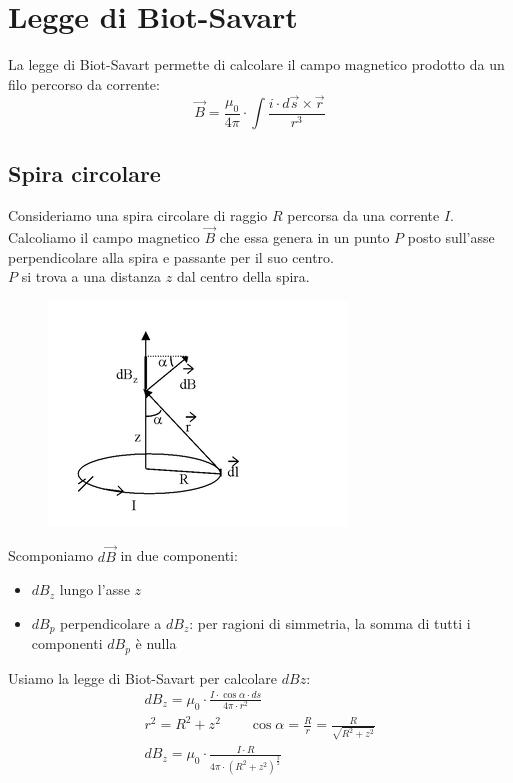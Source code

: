 \section{Legge di Biot-Savart}
La legge di Biot-Savart permette di calcolare il campo magnetico prodotto da un filo percorso da corrente:
\begin{displaymath}
	\vec{B} = \frac{\mu_0}{4\pi} \cdot \int \frac{i \cdot d\vec{s} \times \vec{r}}{r^3}
\end{displaymath}

\subsection{Spira circolare}
Consideriamo una spira circolare di raggio $R$ percorsa da una corrente $I$.\\
Calcoliamo il campo magnetico $\vec{B}$ che essa genera in un punto $P$ posto sull'asse perpendicolare alla spira e passante per il suo centro.\\
$P$ si trova a una distanza $z$ dal centro della spira.
\begin{figure}[h!]
	\centering
	\includegraphics[]{biotSavart.png}
\end{figure}
Scomponiamo $d\vec{B}$ in due componenti:
\begin{itemize}
\item{$dB_z$ lungo l'asse $z$}
\item{$dB_p$ perpendicolare a $dB_z$: per ragioni di simmetria, la somma di tutti i componenti $dB_p$ è nulla}
\end{itemize}
Usiamo la legge di Biot-Savart per calcolare $dBz$:
\begin{displaymath}\begin{aligned}
	dB_z = \mu_0 \cdot \frac{I \cdot \cos{\alpha} \cdot ds}{4\pi \cdot r^2}\\
    r^2 = R^2 + z^2 \qquad \cos{\alpha} = \frac{R}{r} = \frac{R}{\sqrt{R^2 + z^2}}\\
    dB_z = \mu_0 \cdot \frac{I \cdot R}{4\pi \cdot (R^2 + z^2)^\frac{3}{2}}\\
\end{aligned}\end{displaymath}

